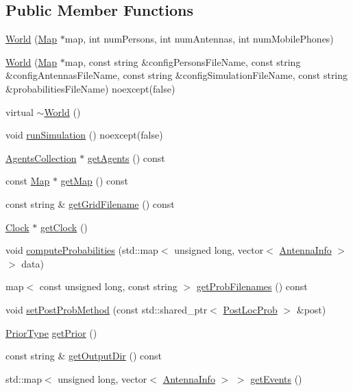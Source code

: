 \subsection*{Public Member Functions}
\begin{DoxyCompactItemize}
\item 
\hyperlink{class_world_a94871f094bb3eabb67f5bd1b10396832}{World} (\hyperlink{class_map}{Map} $\ast$map, int num\+Persons, int num\+Antennas, int num\+Mobile\+Phones)
\item 
\hyperlink{class_world_adeb8454b3713d9dc1d05ca1f901e7b77}{World} (\hyperlink{class_map}{Map} $\ast$map, const string \&config\+Persons\+File\+Name, const string \&config\+Antennas\+File\+Name, const string \&config\+Simulation\+File\+Name, const string \&probabilities\+File\+Name) noexcept(false)
\item 
virtual \hyperlink{class_world_a9ce9875f5e35e293661857e4a2c1d2e4}{$\sim$\+World} ()
\item 
void \hyperlink{class_world_aa825a43f968c8fe750c67156e64721ff}{run\+Simulation} () noexcept(false)
\item 
\hyperlink{class_agents_collection}{Agents\+Collection} $\ast$ \hyperlink{class_world_a8cf8a54ae1f3cb61efeba2b3acebb7cc}{get\+Agents} () const
\item 
const \hyperlink{class_map}{Map} $\ast$ \hyperlink{class_world_a33b8543ee812ae4f8ff93329444da4cb}{get\+Map} () const
\item 
const string \& \hyperlink{class_world_a7d07b06f9884185161c5cc34034a7212}{get\+Grid\+Filename} () const
\item 
\hyperlink{class_clock}{Clock} $\ast$ \hyperlink{class_world_aa51e0799a58035305307e398a81ffeb2}{get\+Clock} ()
\item 
void \hyperlink{class_world_ad98b713484ef1c92ded7eec352a496a5}{compute\+Probabilities} (std\+::map$<$ unsigned long, vector$<$ \hyperlink{class_antenna_info}{Antenna\+Info} $>$$>$ data)
\item 
map$<$ const unsigned long, const string $>$ \hyperlink{class_world_a026bdf1e190cdaf02481c548b8ca1a6f}{get\+Prob\+Filenames} () const
\item 
void \hyperlink{class_world_a176205a2d3e28cca6fb7ac2fc9e8670e}{set\+Post\+Prob\+Method} (const std\+::shared\+\_\+ptr$<$ \hyperlink{class_post_loc_prob}{Post\+Loc\+Prob} $>$ \&post)
\item 
\hyperlink{_prior_type_8h_a61286c562e68de246982fc393a7c23a5}{Prior\+Type} \hyperlink{class_world_aeba13dcf92dac761cf5cac1c8f2266c9}{get\+Prior} ()
\item 
const string \& \hyperlink{class_world_a2830d2aea7d91f98257c1e661527289e}{get\+Output\+Dir} () const
\item 
std\+::map$<$ unsigned long, vector$<$ \hyperlink{class_antenna_info}{Antenna\+Info} $>$ $>$ \hyperlink{class_world_a65eab81f8a895b605cbc90d887d0671a}{get\+Events} ()
\end{DoxyCompactItemize}
